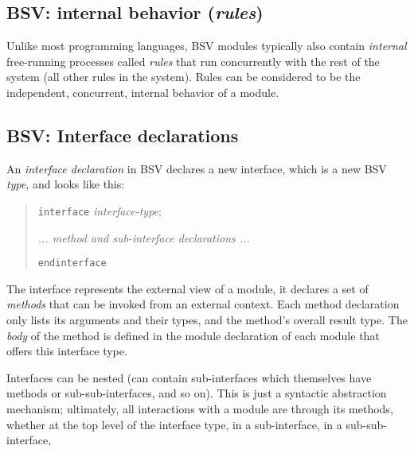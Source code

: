 
\subsection{BSV: internal behavior (\emph{rules})}

\label{Sec_rules1}


Unlike most programming languages, BSV modules typically also contain
\emph{internal} free-running processes called \emph{rules} that run
concurrently with the rest of the system (all other rules in the
system).  Rules can be considered to be the independent, concurrent,
internal behavior of a module.


\subsection{BSV: Interface declarations}


An \emph{interface declaration} in BSV declares a new interface, which
is a new BSV \emph{type}, and looks like this:

\begin{quote}
{\tt interface} \emph{interface-type};

\hmm \emph{... method and sub-interface declarations ...}

{\tt endinterface}
\end{quote}

The interface represents the external view of a module, {\ie} it
declares a set of \emph{methods} that can be invoked from an external
context.  Each method declaration only lists its arguments and their
types, and the method's overall result type.  The \emph{body} of the
method is defined in the module declaration of each module that offers
this interface type.

Interfaces can be nested (can contain sub-interfaces which themselves
have methods or sub-sub-interfaces, and so on).  This is just a
syntactic abstraction mechanism; ultimately, all interactions with a
module are through its methods, whether at the top level of the
interface type, in a sub-interface, in a sub-sub-interface, {\etc}

